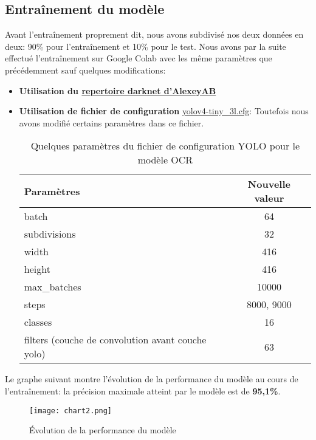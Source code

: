     \subsection{Entraînement du modèle}
    Avant l’entraînement proprement dit, nous avons subdivisé nos deux données en deux: 90\% pour l’entraînement et 10\% pour le test. Nous avons par la suite effectué l’entraînement sur Google Colab avec les même paramètres que précédemment sauf quelques modifications:
    \begin{itemize}
        \item \textbf{Utilisation du \href{https://github.com/AlexeyAB/darknet/}{repertoire darknet d'AlexeyAB}}
        \item \textbf{Utilisation de fichier de configuration} \href{https://github.com/AlexeyAB/darknet/blob/master/cfg/yolov4-tiny-3l.cfg}{yolov4-tiny\_3l.cfg}: Toutefois nous avons modifié certains paramètres dans ce fichier.
        \begin{table}[H]
            \centering
            \begin{tabular}{|l|c|}
                \hline
                \rowcolor{Gray}
                \textbf{Paramètres} & \textbf{Nouvelle valeur} \\ \hline
                batch & 64 \\ \hline
                subdivisions & 32 \\ \hline
                width & 416 \\ \hline
                height & 416 \\ \hline
                max\_batches & 10000 \\ \hline
                steps & 8000, 9000 \\ \hline
                classes & 16 \\ \hline
                filters (couche de convolution avant couche yolo) & 63 \\ \hline 
            \end{tabular}
            \caption{Quelques paramètres du fichier de configuration YOLO pour le modèle OCR}
        \end{table}
    \end{itemize}
    Le graphe suivant montre l'évolution de la performance du modèle au cours de l'entraînement: la précision maximale atteint par le modèle est de \textbf{95,1\%}.
        \begin{figure}[H]
            \centering
            \texttt{[image: chart2.png]}
            \caption{Évolution de la performance du modèle}
        \end{figure}
